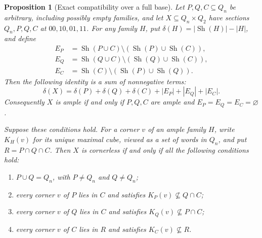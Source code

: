 \documentclass[11pt]{article}
\numberwithin{equation}{section}
\newtheorem{proposition}[theorem]{Proposition}
\theoremstyle{definition}
\theoremstyle{remark}
\begin{document}
\begin{proposition}[Exact compatibility over a full base]
\label{prop:full-base-shadow-defect}
Let $P,Q,C\subseteq Q_n$ be arbitrary, including possibly empty
families, and let $X\subseteq Q_n\times Q_2$ have sections
$Q_n,P,Q,C$ at $00,10,01,11$. For any family $H$, put
$\delta(H)=|\operatorname{Sh}(H)|-|H|$, and define
\[
\begin{split}
 E_P&=\operatorname{Sh}(P\cup C)\setminus
       (\operatorname{Sh}(P)\cup\operatorname{Sh}(C)),\\
 E_Q&=\operatorname{Sh}(Q\cup C)\setminus
       (\operatorname{Sh}(Q)\cup\operatorname{Sh}(C)),\\
 E_C&=\operatorname{Sh}(C)\setminus
       (\operatorname{Sh}(P)\cup\operatorname{Sh}(Q)).
\end{split}
\]
Then the following identity is a sum of nonnegative terms:
\begin{equation}
 \delta(X)=\delta(P)+\delta(Q)+\delta(C)
                  +|E_P|+|E_Q|+|E_C|.
 \label{eq:full-base-shadow-defect}
\end{equation}
Consequently $X$ is ample if and only if $P,Q,C$ are ample and
$E_P=E_Q=E_C=\varnothing$.

Suppose these conditions hold. For a corner $v$ of an ample family
$H$, write $K_H(v)$ for its unique maximal cube, viewed as a set of
words in $Q_n$, and put $R=P\cap Q\cap C$. Then $X$ is cornerless
if and only if all the following conditions hold:
\begin{enumerate}
 \item $P\cup Q=Q_n$, with $P\ne Q_n$ and $Q\ne Q_n$;
 \item every corner $v$ of $P$ lies in $C$ and satisfies
       $K_P(v)\not\subseteq Q\cap C$;
 \item every corner $v$ of $Q$ lies in $C$ and satisfies
       $K_Q(v)\not\subseteq P\cap C$;
 \item every corner $v$ of $C$ lies in $R$ and satisfies
       $K_C(v)\not\subseteq R$.
\end{enumerate}
\end{proposition}
\end{document}
